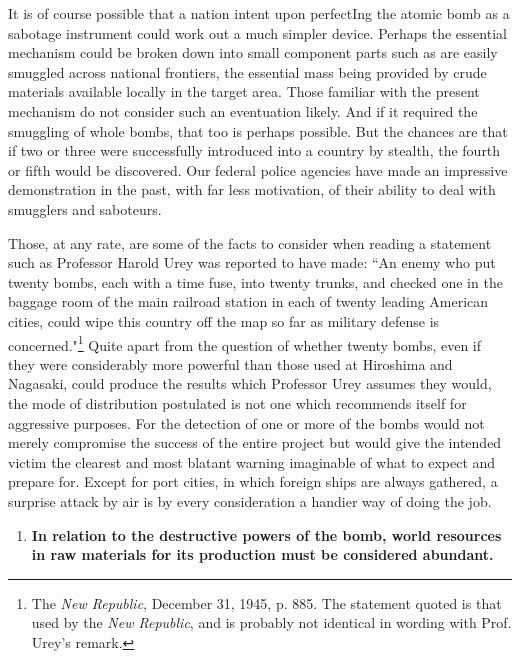 It is of course possible that a nation intent upon perfectIng the atomic bomb as a sabotage instrument could work out a much simpler device. Perhaps the essential mechanism could be broken down into small component parts such as are easily smuggled across national frontiers, the essential mass being provided by crude materials available locally in the target area. Those familiar with the present mechanism do not consider such an eventuation likely. And if it required the smuggling of whole bombs, that too is perhaps possible. But the chances are that if two or three were successfully introduced into a country by stealth, the fourth or fifth would be discovered. Our federal police agencies have made an impressive demonstration in the past, with far less motivation, of their ability to deal with smugglers and saboteurs.

Those, at any rate, are some of the facts to consider when reading a statement such as Professor Harold Urey was reported to have made: ``An enemy who put twenty bombs, each with a time fuse, into twenty trunks, and checked one in the baggage room of the main railroad station in each of twenty leading American cities, could wipe this country off the map so far as military defense is concerned."\footnote{The \textit{New Republic}, December 31, 1945, p. 885. The statement quoted is that used by the \textit{New Republic}, and is probably not identical in wording with Prof. Urey's remark.} Quite apart from the question of whether twenty bombs, even if they were considerably more powerful than those used at Hiroshima and Nagasaki, could produce the results which Professor Urey assumes they would, the mode of distribution postulated is not one which recommends itself for aggressive purposes. For the detection of one or more of the bombs would not merely compromise the success of the entire project but would give the intended victim the clearest and most blatant warning imaginable of what to expect and prepare for. Except for port cities, in which foreign ships are always gathered, a surprise attack by air is by every consideration a handier way of doing the job.

\begin{enumerate}[resume*]

\item \textbf{In relation to the destructive powers of the bomb, world resources in raw materials for its production must be considered abundant.}

\end{enumerate}

